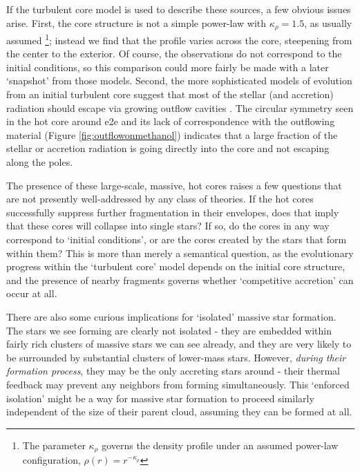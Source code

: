 \documentclass{aa}
\begin{document}
If the turbulent core model is used to describe these sources, a few obvious
issues arise.  First, the core structure is not a simple power-law with
$\kappa_\rho=1.5$, as usually assumed
\citep{McKee2003a,Zhang2011a}\footnote{The parameter $\kappa_\rho$ governs the
density profile under an assumed power-law configuration, $\rho(r) =
r^{-\kappa_{\rho}}$}; instead we find that the profile varies across the core,
steepening from the center to the exterior.
Of course, the observations do not correspond to the initial
conditions, so this comparison could more fairly be made with a later
`snapshot' from those models.  Second, the more sophisticated models of
evolution from an initial turbulent core suggest that most of the stellar (and
accretion) radiation should escape via growing outflow cavities
\citep{Zhang2011a,Zhang2013h,Zhang2014e}.  The circular symmetry seen in the
hot core around e2e and its lack of correspondence with the outflowing material
(Figure \ref{fig:outflowonmethanol}) indicates that a large fraction of the
stellar or accretion radiation is going directly into the core and not escaping
along the poles.

The presence of these large-scale, massive, hot cores raises a few questions
that are not presently well-addressed by any class of theories.  If the hot
cores successfully suppress further fragmentation in their envelopes, does that
imply that these cores will collapse into single stars?  If so, do the cores in
any way correspond to `initial conditions', or are the cores created by the
stars that form within them?  This is more than merely a semantical question,
as the evolutionary progress within the `turbulent core' model depends on the
initial core structure, and the presence of nearby fragments governs whether
`competitive accretion' can occur at all.

There are also some curious implications for `isolated' massive star formation.
The stars we see forming are clearly not isolated - they are embedded within
fairly rich clusters of massive stars we can see already, and they are very likely
to be surrounded by substantial clusters of lower-mass stars.  However, \emph{during
their formation process}, they may be the only accreting stars around - their
thermal feedback may prevent any neighbors from forming simultaneously.  This
`enforced isolation' might be a way for massive star formation to proceed
similarly independent of the size of their parent cloud, assuming they can be
formed at all.
\end{document}
